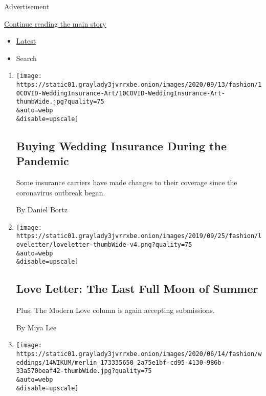 Advertisement

\protect\hyperlink{after-subheader}{Continue reading the main story}

\begin{itemize}
\tightlist
\item
  \protect\hyperlink{stream-panel}{Latest}
\item
  Search
\end{itemize}

\begin{enumerate}
\def\labelenumi{\arabic{enumi}.}
\item
  \href{/2020/09/10/fashion/weddings/buying-wedding-insurance-during-covid-pandemic.html}{}

  \texttt{[image: https://static01.graylady3jvrrxbe.onion/images/2020/09/13/fashion/10COVID-WeddingInsurance-Art/10COVID-WeddingInsurance-Art-thumbWide.jpg?quality=75\\\&auto=webp\\\&disable=upscale]}

  \hypertarget{buying-wedding-insurance-during-the-pandemic}{%
  \subsection{Buying Wedding Insurance During the
  Pandemic}\label{buying-wedding-insurance-during-the-pandemic}}

  Some insurance carriers have made changes to their coverage since the
  coronavirus outbreak began.

  By Daniel Bortz
\item
  \href{/2020/09/04/style/love-letter-the-last-full-moon-of-summer-newsletter.html}{}

  \texttt{[image: https://static01.graylady3jvrrxbe.onion/images/2019/09/25/fashion/loveletter/loveletter-thumbWide-v4.png?quality=75\\\&auto=webp\\\&disable=upscale]}

  \hypertarget{love-letter-the-last-full-moon-of-summer}{%
  \subsection{Love Letter: The Last Full Moon of
  Summer}\label{love-letter-the-last-full-moon-of-summer}}

  Plus: The Modern Love column is again accepting submissions.

  By Miya Lee
\item
  \href{/2020/06/14/fashion/weddings/michelle-wikum-walker-williams.html}{}

  \texttt{[image: https://static01.graylady3jvrrxbe.onion/images/2020/06/14/fashion/weddings/14WIKUM/merlin\_173335650\_2a75e1bf-cd95-4130-986b-33a570beaf42-thumbWide.jpg?quality=75\\\&auto=webp\\\&disable=upscale]}


\end{enumerate}
